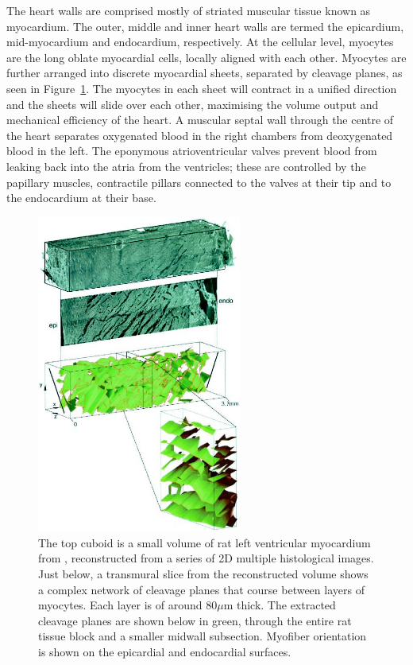 The heart walls are comprised mostly of striated muscular tissue known as myocardium. The outer, middle and inner heart walls are termed the epicardium, mid-myocardium and endocardium, respectively. At the cellular level, myocytes are the long oblate myocardial cells, locally aligned with each other. Myocytes are further arranged into discrete myocardial sheets, separated by cleavage planes, as seen in Figure~\ref{fig:sheets}. The myocytes in each sheet will contract in a unified direction and the sheets will slide over each other, maximising the volume output and mechanical efficiency of the heart. A muscular septal wall through the centre of the heart separates oxygenated blood in the right chambers from deoxygenated blood in the left. The eponymous atrioventricular valves prevent blood from leaking back into the atria from the ventricles; these are controlled by the papillary muscles, contractile pillars connected to the valves at their tip and to the endocardium at their base.

  \begin{figure}[htbp]
    \centering
    \includegraphics[width=0.6\textwidth]{Ch2/Figs/sheets}
    \caption{The top cuboid is a small volume of rat left ventricular myocardium from \cite{Hooks2002}, reconstructed from a series of 2D multiple histological images. Just below, a transmural slice from the reconstructed volume shows a complex network of cleavage planes that course between layers of myocytes. Each layer is of around 80$\mu$m thick. The extracted cleavage planes are shown below in green, through the entire rat tissue block and a smaller midwall subsection. Myofiber orientation is shown on the epicardial and endocardial surfaces.}
    \label{fig:sheets}
  \end{figure}

